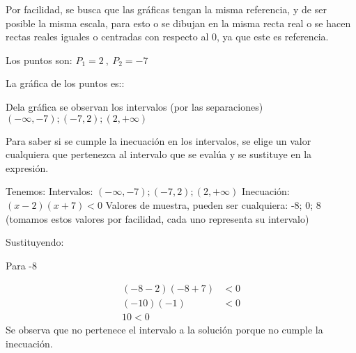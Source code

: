     Por facilidad, se busca que las gráficas tengan la misma referencia, y de ser
    posible la misma escala, para esto o se dibujan en la misma recta real o se hacen
    rectas reales iguales o centradas con respecto al 0, ya que este es referencia.

    Los puntos son: $ P_1 = 2\ ,\ P_2 =-7 $

    La gráfica de los puntos es::

    \vspace*{1cm}

    Dela gráfica se observan los intervalos (por las separaciones) $ \displaystyle
    (-\infty,-7);(-7,2);(2,+\infty)$


    Para saber si se cumple la inecuación en los intervalos, se elige un valor cualquiera
    que pertenezca al intervalo que se evalúa y se sustituye en la expresión.

    Tenemos:
    Intervalos: $ \displaystyle (-\infty,-7);(-7,2);(2,+\infty)$
    Inecuación: $ (x-2)(x+7) < 0 $
    Valores de muestra, pueden ser cualquiera:
    -8; 0; 8 (tomamos estos valores por facilidad, cada uno representa su intervalo)

    Sustituyendo:

    Para -8

    \begin{align*}
        (-8-2)(-8+7) & < 0  		\\
        (-10)(-1)   & < 0\\
        10 < 0
    \end{align*}
    Se observa que no pertenece el intervalo a la solución porque no cumple la inecuación.


